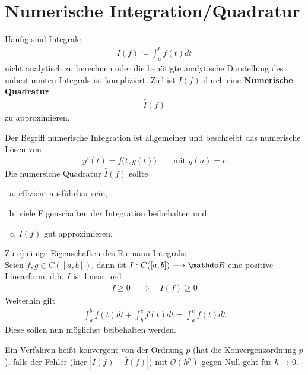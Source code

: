 % 
% 
% 
% 



\chapter{Numerische Integration/Quadratur}


Häufig sind Integrale
\begin{gather*}
  I(f) \coloneqq \int_a^bf(t)dt
\end{gather*}
nicht analytisch zu berechnen
oder die benötigte analytische Darstellung
des unbestimmten Integrals ist kompliziert.
Ziel ist $I(f)$ durch eine 
\textbf{Numerische Quadratur}
\begin{gather*}
  \hat{I}(f)
\end{gather*}
zu approximieren.

Der Begriff numerische Integration ist allgemeiner und
beschreibt das numerische Lösen von
\begin{gather*}
  y'(t) = f\big(t,y(t)\big) \qquad \text{mit } y(a)=c
\end{gather*}
Die numersiche Quadratur $\hat{I}(f)$ sollte
\begin{enumerate}[a)]
\item effizient ausführbar sein,
\item viele Eigenschaften der Integration beibehalten und
\item $I(f)$ gut approximieren.
\end{enumerate}
Zu c) einige Eigenschaften des Riemann-Integrals:\\
Seien $f,g\in C([a,b])$, dann ist $I:C([a,b])\longrightarrow\R$
eine positive Linearform, d.h. $I$ ist linear und 
\begin{gather}
  f\geq 0 \quad \Rightarrow \quad I(f)\geq 0
  \label{VII.1.1}
\end{gather}
Weiterhin gilt
\begin{gather}
  \int_a^b f(t)dt + \int_b^c f(t)dt = \int_a^cf(t)dt
  \label{VII.1.2}
\end{gather}
Diese sollen nun möglichst beibehalten werden.

\begin{Defe}\label{7.1.1}
  Ein Verfahren heißt konvergent von der Ordnung $p$
  (hat die Konvergenzordnung $p$),
  falls der Fehler (hier $|I(f)-\hat{I}(f)|$)
  mit $\mathcal{O}(h^p)$ gegen Null geht für $h\longrightarrow 0$.
\end{Defe}


